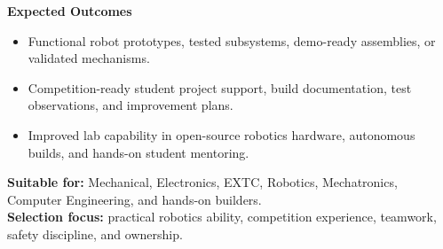 \documentclass[10pt,a4paper]{article}
\newcommand{\RoleSection}[1]{\vspace{5pt}\par\noindent\textbf{#1}\par\vspace{2pt}}
\begin{document}
{\RoleSection{Expected Outcomes}
\begin{itemize}
  \item Functional robot prototypes, tested subsystems, demo-ready assemblies, or validated mechanisms.
  \item Competition-ready student project support, build documentation, test observations, and improvement plans.
  \item Improved lab capability in open-source robotics hardware, autonomous builds, and hands-on student mentoring.
\end{itemize}

\textbf{Suitable for:} Mechanical, Electronics, EXTC, Robotics, Mechatronics, Computer Engineering, and hands-on builders.\\
\textbf{Selection focus:} practical robotics ability, competition experience, teamwork, safety discipline, and ownership.
}
\end{document}

